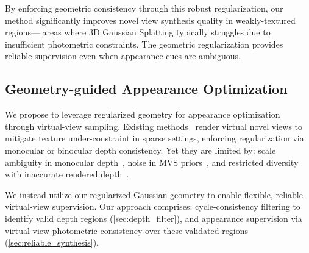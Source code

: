 By enforcing geometric consistency through this robust regularization, our 
method significantly improves novel view synthesis quality in weakly-textured regions—
areas where 3D Gaussian Splatting typically struggles due to insufficient photometric 
constraints.
The geometric regularization provides reliable supervision even when 
appearance cues are ambiguous.










\subsection{Geometry-guided Appearance Optimization }
\label{subsec:appearance}
We propose to leverage regularized geometry for appearance optimization through 
virtual-view sampling. 
Existing methods~\cite{zhu2024fsgs,li2024dngaussian,xu2024mvpgs,han2024binocular} 
render virtual novel views to mitigate texture under-constraint in sparse settings, 
enforcing regularization via monocular or binocular depth consistency.
Yet they 
are limited by: scale ambiguity in monocular depth~\cite{zhu2024fsgs,li2024dngaussian}, 
noise in MVS priors~\cite{xu2024mvpgs}, and restricted diversity with inaccurate 
rendered depth~\cite{han2024binocular}.

We instead utilize our regularized Gaussian geometry to enable flexible, reliable 
virtual-view supervision. Our approach comprises: cycle-consistency 
filtering to identify valid depth regions (\cref{sec:depth_filter}), and 
appearance supervision via virtual-view photometric consistency over these 
validated regions (\cref{sec:reliable_synthesis}).



